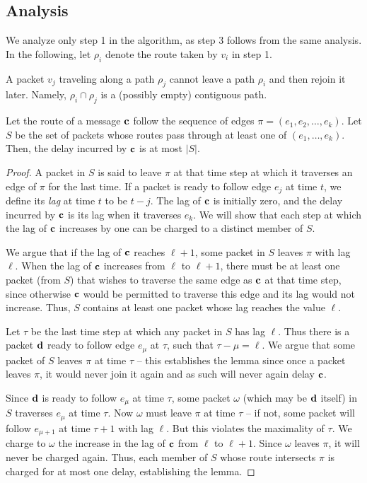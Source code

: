 \subsection{Analysis}
We analyze only step 1 in the algorithm, as step 3 follows from the
same analysis.  In the following, let $\rho_i$ denote the route taken
by $v_i$ in step 1.

\begin{exercise}
    A packet $v_j$ traveling along a path $\rho_j$ cannot leave a path
    $\rho_i$ and then rejoin it later. Namely, $\rho_i \cap \rho_j$ is a
    (possibly empty) contiguous path.
\end{exercise}

\begin{lemma}
    Let the route of a message $\mathbf{c}$ follow the sequence of edges
    $\pi = (e_1, e_2, \ldots, e_k)$. Let $S$ be the set of packets
    whose routes pass through at least one of $(e_1, \ldots, e_k)$.
    Then, the delay incurred by $\mathbf{c}$ is at most $|S|$.
\end{lemma}

\begin{proof}
    A packet in $S$ is said to leave $\pi$ at that time step at which
    it traverses an edge of $\pi$ for the last time. If a packet is
    ready to follow edge $e_j$ at time $t$, we define its \emph{lag}
    at time $t$ to be $t-j$. The lag of $\mathbf{c}$ is initially zero,
    and the delay incurred by $\mathbf{c}$ is its lag when it traverses
    $e_k$. We will show that each step at which the lag of $\mathbf{c}$
    increases by one can be charged to a distinct member of $S$.

    We argue that if the lag of $\mathbf{c}$ reaches $\ell+1$, some
    packet in $S$ leaves $\pi$ with lag $\ell$. When the lag of
    $\mathbf{c}$ increases from $\ell$ to $\ell +1$, there must be at
    least one packet (from $S$) that wishes to traverse the same edge
    as $\mathbf{c}$ at that time step, since otherwise $\mathbf{c}$ would be
    permitted to traverse this edge and its lag would not increase.
    Thus, $S$ contains at least one packet whose lag reaches the value
    $\ell$.

    Let $\tau$ be the last time step at which any packet in $S$ has
    lag $\ell$. Thus there is a packet $\mathbf{d}$ ready to follow edge
    $e_{\mu}$ at $\tau$, such that $\tau - \mu = \ell$. We argue that
    some packet of $S$ leaves $\pi$ at time $\tau$ -- this establishes
    the lemma since once a packet leaves $\pi$, it would never join it
    again and as such will never again delay $\mathbf{c}$.

    Since $\mathbf{d}$ is ready to follow $e_{\mu}$ at time $\tau$, some packet
    $\omega$ (which may be $\mathbf{d}$ itself) in $S$ traverses $e_\mu$ at time
    $\tau$. Now $\omega$ must leave $\pi$ at time $\tau$ -- if not, some packet will
    follow $e_{\mu+1}$ at time $\tau+1$ with lag $\ell$.  But this
    violates the maximality of $\tau$.  We charge to $\omega$ the increase in the
    lag of $\mathbf{c}$ from $\ell$ to $\ell+1$. Since $\omega$ leaves
    $\pi$, it will never be charged again. Thus, each member of $S$ whose
    route intersects $\pi$ is charged for at most one delay, establishing
    the lemma.
\end{proof}


